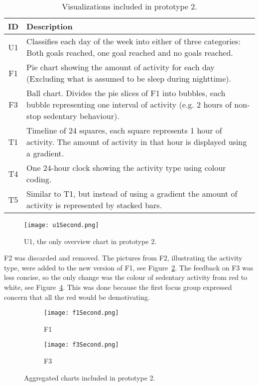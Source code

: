 \begin{table}[h!]
  \centering
  \begin{tabular}{|c|p{11cm}|}
    \hline
    \textbf{ID} & \textbf{Description} \\ \hline
    U1 & Classifies each day of the week into either of three categories: Both goals reached, one goal reached and no goals reached. \\ \hline
    F1 & Pie chart showing the amount of activity for each day (Excluding what is assumed to be sleep during nighttime). \\ \hline
    F3 & Ball chart. Divides the pie slices of F1 into bubbles, each bubble representing one interval of activity (e.g. 2 hours of non-stop sedentary behaviour). \\ \hline
    T1 & Timeline of 24 squares, each square represents 1 hour of activity. The amount of activity in that hour is displayed using a gradient. \\ \hline
    T4 & One 24-hour clock showing the activity type using colour coding. \\ \hline
    T5 & Similar to T1, but instead of using a gradient the amount of activity is represented by stacked bars. \\ \hline
  \end{tabular}
  \caption{Visualizations included in prototype 2.}
  \label{tab:runProtDesc2}
\end{table}

\begin{figure}[h!]
  \centering
  \texttt{[image: u1Second.png]}
  \caption{U1, the only overview chart in prototype 2.}
  \label{fig:uSecond}
\end{figure}

F2 was discarded and removed. The pictures from F2, illustrating the activity type, were added to the new version of F1, see Figure~\ref{fig:f1Second}. The feedback on F3 was less concise, so the only change was the colour of sedentary activity from red to white, see Figure~\ref{fig:f3Second}. This was done because the first focus group expressed concern that all the red would be demotivating.

\begin{figure}[h!]
  \centering
  \begin{subfigure}[b]{0.45\textwidth}
    \centering
    \texttt{[image: f1Second.png]}
    \caption{F1}
    \label{fig:f1Second}
  \end{subfigure}
  \begin{subfigure}[b]{0.45\textwidth}
    \centering
    \texttt{[image: f3Second.png]}
    \caption{F3}
    \label{fig:f3Second}
  \end{subfigure}
  \caption{Aggregated charts included in prototype 2.}
\end{figure}


